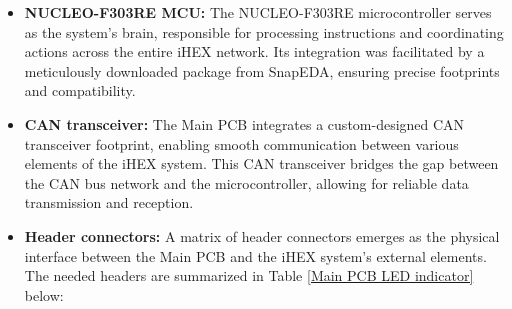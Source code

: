 \begin{itemize}
    \item \textbf{NUCLEO-F303RE MCU:} The NUCLEO-F303RE microcontroller serves as the system's brain, responsible for processing instructions and coordinating actions across the entire iHEX network. Its integration was facilitated by a meticulously downloaded package from SnapEDA, ensuring precise footprints and compatibility.
    \item \textbf{CAN transceiver:} The Main PCB integrates a custom-designed CAN transceiver footprint, enabling smooth communication between various elements of the iHEX system. This CAN transceiver bridges the gap between the CAN bus network and the microcontroller, allowing for reliable data transmission and reception.
    \item \textbf{Header connectors:}
    A matrix of header connectors emerges as the physical interface between the Main PCB and the iHEX system's external elements. The needed headers are summarized in Table \ref{Main PCB LED indicator} below:
    

\end{itemize}
